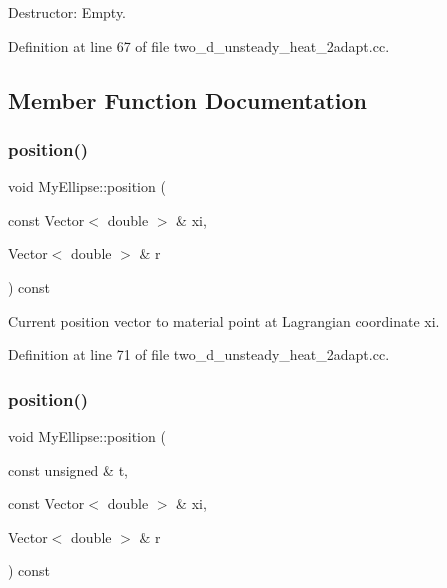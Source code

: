 Destructor\+: Empty. 



Definition at line 67 of file two\+\_\+d\+\_\+unsteady\+\_\+heat\+\_\+2adapt.\+cc.



\subsection{Member Function Documentation}
\mbox{\label{classMyEllipse_a7b139a2f4564005773c83325f2414e3e}} 
\subsubsection{\texorpdfstring{position()}{position()}\hspace{0.1cm}{\footnotesize\ttfamily [1/2]}}
{\footnotesize\ttfamily void My\+Ellipse\+::position (\begin{DoxyParamCaption}\item[{const Vector$<$ double $>$ \&}]{xi,  }\item[{Vector$<$ double $>$ \&}]{r }\end{DoxyParamCaption}) const\hspace{0.3cm}{\ttfamily [inline]}}



Current position vector to material point at Lagrangian coordinate xi. 



Definition at line 71 of file two\+\_\+d\+\_\+unsteady\+\_\+heat\+\_\+2adapt.\+cc.

\mbox{\label{classMyEllipse_a93f75bf33969037e35d779738a8493f5}} 
\subsubsection{\texorpdfstring{position()}{position()}\hspace{0.1cm}{\footnotesize\ttfamily [2/2]}}
{\footnotesize\ttfamily void My\+Ellipse\+::position (\begin{DoxyParamCaption}\item[{const unsigned \&}]{t,  }\item[{const Vector$<$ double $>$ \&}]{xi,  }\item[{Vector$<$ double $>$ \&}]{r }\end{DoxyParamCaption}) const\hspace{0.3cm}{\ttfamily [inline]}}



